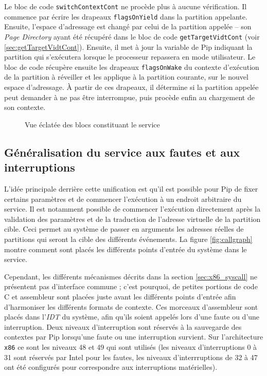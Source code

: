 		Le bloc de code \texttt{switchContextCont} ne procède plus à aucune vérification. Il commence par écrire les drapeaux \texttt{flagsOnYield} dans la partition appelante. Ensuite, l'espace d'adressage est changé par celui de la partition appelée -- son \emph{Page Directory} ayant été récupéré dans le bloc de code \texttt{getTargetVidtCont} (voir \ref{sec:getTargetVidtCont}). Ensuite, il met à jour la variable de Pip indiquant la partition qui s'exécutera lorsque le processeur repassera en mode utilisateur. Le bloc de code récupère ensuite les drapeaux \texttt{flagsOnWake} du contexte d'exécution de la partition à réveiller et les applique à la partition courante, sur le nouvel espace d'adressage. À partir de ces drapeaux, il détermine si la partition appelée peut demander à ne pas être interrompue, puis procède enfin au chargement de son contexte.

		\newpage

		\begin{figure}[!ht]
			
			\caption{Vue éclatée des blocs constituant le service}
			\label{fig:callgraph_direct}
		\end{figure}
		\newpage

		\subsection{Généralisation du service aux fautes et aux interruptions}
		\label{sec:service_generalisation}

		L'idée principale derrière cette unification est qu'il est possible pour Pip de fixer certains paramètres et de commencer l'exécution à un endroit arbitraire du service. Il est notamment possible de commencer l'exécution directement après la validation des paramètres et de la traduction de l'adresse virtuelle de la partition cible. Ceci permet au système de passer en arguments les adresses réelles de partitions qui seront la cible des différents événements. La figure \ref{fig:callgraph} montre comment sont placés les différents points d'entrée du système dans le service.

		Cependant, les différents mécanismes décrits dans la section \ref{sec:x86_syscall} ne présentent pas d'interface commune ; c'est pourquoi, de petites portions de code C et assembleur sont placées juste avant les différents points d'entrée afin d'harmoniser les différents formats de contexte. Ces morceaux d'assembleur sont placés dans l'\emph{IDT} du système, afin qu'ils soient appelés lors d'une faute ou d'une interruption. Deux niveaux d'interruption sont réservés à la sauvegarde des contextes par Pip lorsqu'une faute ou une interruption survient. Sur l'architecture \texttt{x86} ce sont les niveaux 48 et 49 qui sont utilisés (les niveaux d'interruptions 0 à 31 sont réservés par Intel pour les fautes, les niveaux d'interrruptions de 32 à 47 ont été configurés pour correspondre aux interruptions matérielles).

